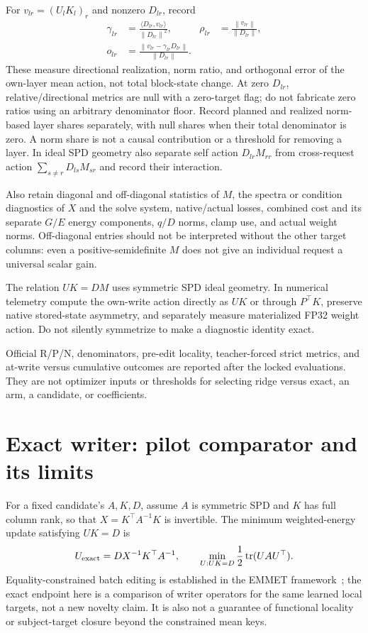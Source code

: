 \documentclass[10pt]{article}
\newcommand{\tr}{\operatorname{tr}}
\newcommand{\norm}[1]{\left\lVert#1\right\rVert}
\begin{document}
For $v_{lr}=(U_lK_l)_r$ and nonzero $D_{lr}$, record
\begin{align}
 \gamma_{lr}&=\frac{\langle D_{lr},v_{lr}\rangle}{\norm{D_{lr}}^2},
 &\rho_{lr}&=\frac{\norm{v_{lr}}}{\norm{D_{lr}}},\\
 o_{lr}&=\frac{\norm{v_{lr}-\gamma_{lr}D_{lr}}}{\norm{D_{lr}}}.
\end{align}
These measure directional realization, norm ratio, and orthogonal error
of the own-layer mean action, not total block-state change. At zero
$D_{lr}$, relative/directional metrics are null with a zero-target flag;
do not fabricate zero ratios using an arbitrary denominator floor.
Record planned and realized norm-based layer shares separately, with
null shares when their total denominator is zero. A norm share is not a
causal contribution or a threshold for removing a layer. In ideal SPD
geometry also separate self action $D_{lr}M_{rr}$ from cross-request
action $\sum_{s\ne r}D_{ls}M_{sr}$ and record their interaction.

Also retain diagonal and off-diagonal statistics of $M$, the spectra or
condition diagnostics of $X$ and the solve system, native/actual losses,
combined cost and its separate $G/E$ energy components, $q/D$ norms,
clamp use, and actual weight norms. Off-diagonal entries should not be
interpreted without the other target columns: even a positive-semidefinite
$M$ does not give an individual request a universal scalar gain.

The relation $UK=DM$ uses symmetric SPD ideal geometry. In numerical
telemetry compute the own-write action directly as $UK$ or through
$P^\top K$, preserve native stored-state asymmetry, and separately
measure materialized FP32 weight action. Do not silently symmetrize to
make a diagnostic identity exact.

Official R/P/N, denominators, pre-edit locality, teacher-forced strict
metrics, and at-write versus cumulative outcomes are reported after
the locked evaluations. They are not optimizer inputs or thresholds
for selecting ridge versus exact, an arm, a candidate, or coefficients.

\newpage
\section{Exact writer: pilot comparator and its limits}
For a fixed candidate's $A,K,D$, assume $A$ is symmetric SPD and $K$
has full column rank, so that $X=K^\top A^{-1}K$ is invertible. The
minimum weighted-energy update satisfying $UK=D$ is
\[
 U_{\rm exact}=D X^{-1}K^\top A^{-1},\qquad
 \min_{U:UK=D}\frac12\tr(UAU^\top).
\]
Equality-constrained batch editing is established in the EMMET
framework~\cite{emmet}; the exact endpoint here is a comparison of writer
operators for the same learned local targets, not a new novelty claim.
It is also not a guarantee of functional locality or subject-target
closure beyond the constrained mean keys.
\end{document}
